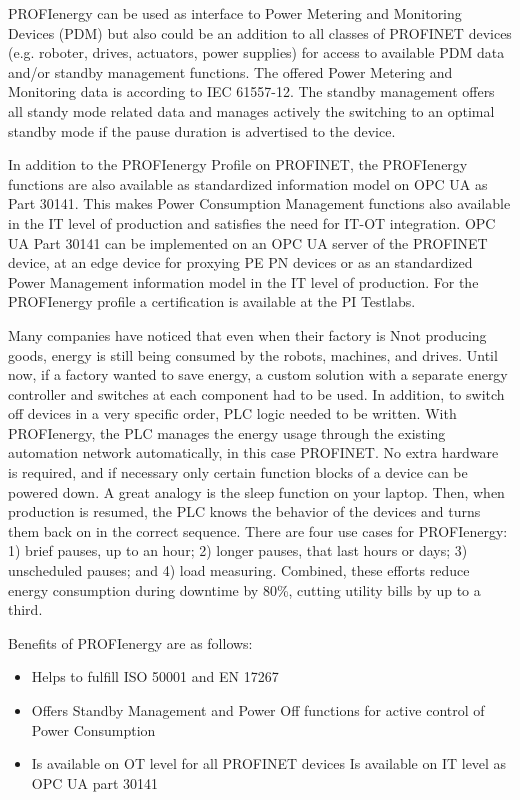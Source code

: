 \documentclass[conference]{IEEEtran}
\begin{document}
PROFIenergy can be used as interface to Power Metering and Monitoring Devices (PDM) but also could be an addition to all classes of PROFINET devices (e.g. roboter, drives, actuators, power supplies) for access to available PDM data and/or standby management functions. The offered Power Metering and Monitoring data is according to IEC 61557-12. The standby management offers all standy mode related data and manages actively the switching to an optimal standby mode if the pause duration is advertised to the device. 

In addition to the PROFIenergy Profile on PROFINET, the PROFIenergy functions are also available as standardized information model on OPC UA as Part 30141. This makes Power Consumption Management functions also available in the IT level of production and satisfies the need for IT-OT integration. OPC UA Part 30141 can be implemented on an OPC UA server of the PROFINET device, at an edge device for proxying PE PN devices or as an standardized Power Management information model in the IT level of production. For the PROFIenergy profile a certification is available at the PI Testlabs.

Many companies have noticed that even  when their factory is Nnot producing goods, energy is still being consumed by the robots,  machines, and drives. Until now, if a factory wanted to save energy, a custom solution with  a separate energy controller and switches at each component had to be used. In addition, to  switch off devices in a very specific order, PLC logic needed to be written. With PROFIenergy,  the PLC manages the energy usage through the existing automation network automatically, in  this case PROFINET. No extra hardware is required, and if necessary only certain function  blocks of a device can be powered down. A great analogy is the sleep function on your  laptop. Then, when production is resumed, the PLC knows the behavior of the devices and  turns them back on in the correct sequence. There are four use cases for PROFIenergy: 1)  brief pauses, up to an hour; 2) longer pauses, that last hours or days; 3) unscheduled pauses;  and 4) load measuring. Combined, these efforts reduce energy consumption during downtime by  80\%, cutting utility bills by up to a third.

Benefits of PROFIenergy are as follows:
\begin{itemize}
    \item Helps to fulfill ISO 50001 and EN 17267
    \item Offers Standby Management and Power Off functions for active control of Power Consumption
    \item Is available on OT level for all PROFINET devices
    \text Is available on IT level as OPC UA part 30141
\end{itemize}
\end{document}
